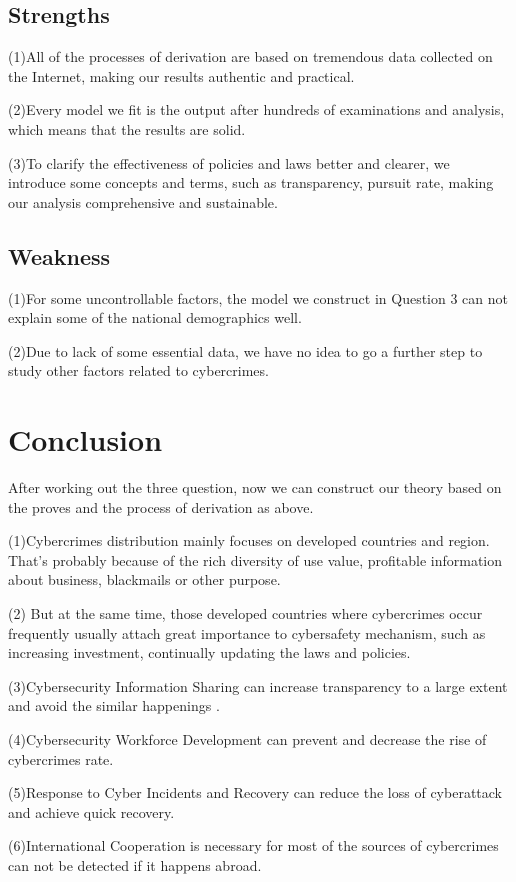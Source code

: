 \documentclass[12pt]{article}
\begin{document}
	\subsection{Strengths}
	(1)All of the processes of derivation are based on tremendous data collected on the Internet, making our results authentic and practical.

	(2)Every model we fit is the output after hundreds of examinations and analysis, which means that the results are solid.

	(3)To clarify the effectiveness of policies and laws better and clearer, we introduce some concepts and terms, such as transparency, pursuit rate, making our analysis comprehensive and sustainable.

	\subsection{Weakness}

	(1)For some uncontrollable factors, the model we construct in Question 3 can not explain some of the national demographics well.

	(2)Due to lack of some essential data, we have no idea to go a further step to study other factors related to cybercrimes.
	\section{Conclusion}
	After working out the three question, now we can construct our theory based on the proves and the process of derivation as above.
	
	(1)Cybercrimes distribution mainly focuses on developed countries and region. That’s probably because of the rich diversity of use value, profitable information about business, blackmails or other purpose.

	(2) But at the same time, those developed countries where cybercrimes occur frequently usually attach great importance to cybersafety mechanism, such as increasing investment, continually updating the laws and policies.
	
	(3)Cybersecurity Information Sharing can increase transparency to a large extent and avoid the similar happenings .
	
	(4)Cybersecurity Workforce Development can prevent and decrease the rise of cybercrimes rate.
	
	(5)Response to Cyber Incidents and Recovery can reduce the loss of cyberattack and achieve quick recovery.
	
	(6)International Cooperation is necessary for most of the sources of cybercrimes can not be detected if it happens abroad.
	
\end{document}
